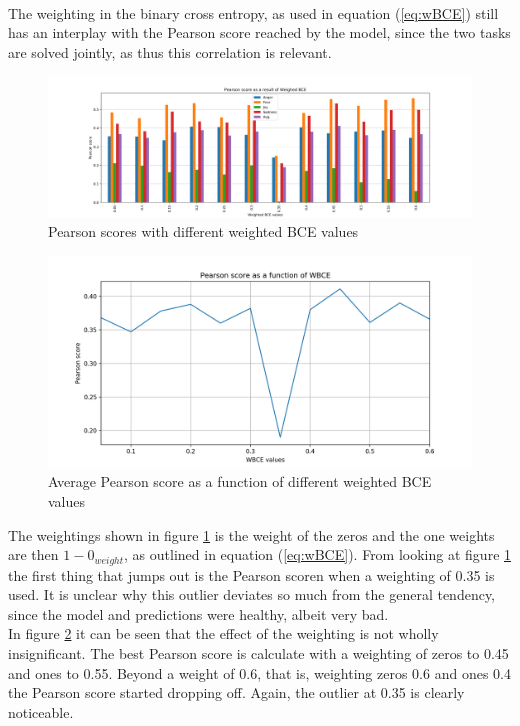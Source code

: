 \\
The weighting in the binary cross entropy, as used in equation (\ref{eq:wBCE}) still has an interplay with the Pearson score reached by the model, since the two tasks are solved jointly, as thus this correlation is relevant.
\begin{figure}[H]
    \centering
        \includegraphics[width=\textwidth]{pictures/weightedBCEvalues.png}
        \caption{Pearson scores with different weighted BCE values}
        \label{fig:BCEvalues}
\end{figure}
\begin{figure}[H]
    \centering
        \includegraphics[width=\textwidth]{pictures/weightedBCEplot.png}
        \caption{Average Pearson score as a function of different weighted BCE values}
        \label{fig:averageBCE}
\end{figure}
The weightings shown in figure \ref{fig:BCEvalues} is the weight of the zeros and the one weights are then $1-0_{weight}$, as outlined in equation (\ref{eq:wBCE}). From looking at figure \ref{fig:BCEvalues} the first thing that jumps out is the Pearson scoren when a weighting of 0.35 is used. It is unclear why this outlier deviates so much from the general tendency, since the model and predictions were healthy, albeit very bad.\\
In figure \ref{fig:averageBCE} it can be seen that the effect of the weighting is not wholly insignificant. The best Pearson score is calculate with a weighting of zeros to 0.45 and ones to 0.55. Beyond a weight of 0.6, that is, weighting zeros 0.6 and ones 0.4 the Pearson score started dropping off. Again, the outlier at 0.35 is clearly noticeable.\\
